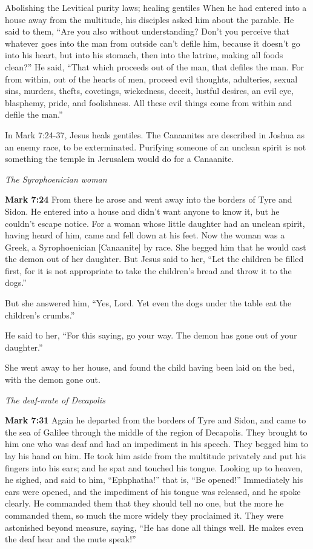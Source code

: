 \documentclass[10pt,twoside]{book}
\newcommand{\quotesize}{\normalsize{}}
\newcommand{\comm}[1]{\begingroup \color{black!50} #1\endgroup}
\newenvironment{quotetext}{\begingroup\quotesize}{\endgroup}
\newcommand{\bible}[2]{\begin{quotetext}\textbf{#1} #2\end{quotetext}}
\newcommand{\gospelmark}[2]{\bible{Mark #1}{#2}}
\newcommand{\subhead}[1]{\emph{#1}\par}
\begin{document}
\begin{section}{Abolishing the Levitical purity laws; healing gentiles}
{  When he had entered into a house away from the multitude, his disciples asked him about the parable.   He said to them, ``Are you also without understanding? Don't you perceive that whatever goes into the man from outside can't defile him,    because it doesn't go into his heart, but into his stomach, then into the latrine, making all foods clean?''   He said, ``That which proceeds out of the man, that defiles the man.    For from within, out of the hearts of men, proceed evil thoughts, adulteries, sexual sins, murders, thefts,    covetings, wickedness, deceit, lustful desires, an evil eye, blasphemy, pride, and foolishness.    All these evil things come from within and defile the man.''
}

\comm{
In Mark 7:24-37, Jesus heals gentiles. The Canaanites are described in Joshua as an enemy race, to be exterminated. Purifying someone
of an unclean spirit is not something the temple in Jerusalem would do for a Canaanite.
}

\subhead{The Syrophoenician woman}

\gospelmark{7:24}{
  From there he arose and went away into the borders of Tyre and Sidon. He entered into a house and didn't want anyone to know it, but he couldn't escape notice.   For a woman whose little daughter had an unclean spirit, having heard of him, came and fell down at his feet.   Now the woman was a Greek, a Syrophoenician [Canaanite] by race. She begged him that he would cast the demon out of her daughter.   But Jesus said to her, ``Let the children be filled first, for it is not appropriate to take the children's bread and throw it to the dogs.''

  But she answered him, ``Yes, Lord. Yet even the dogs under the table eat the children's crumbs.''

  He said to her, ``For this saying, go your way. The demon has gone out of your daughter.''

  She went away to her house, and found the child having been laid on the bed, with the demon gone out.
}

\subhead{The deaf-mute of Decapolis}

\gospelmark{7:31}{
  Again he departed from the borders of Tyre and Sidon, and came to the sea of Galilee through the middle of the region of Decapolis.   They brought to him one who was deaf and had an impediment in his speech. They begged him to lay his hand on him.   He took him aside from the multitude privately and put his fingers into his ears; and he spat and touched his tongue.   Looking up to heaven, he sighed, and said to him, ``Ephphatha!'' that is, ``Be opened!''   Immediately his ears were opened, and the impediment of his tongue was released, and he spoke clearly.   He commanded them that they should tell no one, but the more he commanded them, so much the more widely they proclaimed it.   They were astonished beyond measure, saying, ``He has done all things well. He makes even the deaf hear and the mute speak!''
}


\end{section}
\end{document}
